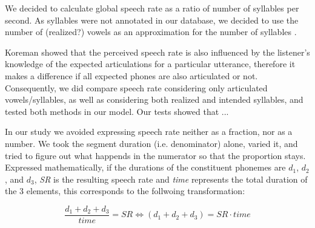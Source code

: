 \documentclass[a4paper]{scrreprt}
\begin{document}
We decided to calculate global speech rate as a ratio of number of syllables per second. As syllables were not annotated in our database, we decided to use the number of (realized?) vowels as an approximation for the number of syllables \cite{Yishan_Jiao_2015} \cite{Kohler1995}.

Koreman showed \cite{Koreman_2006} that the perceived speech rate is also influenced by the listener's knowledge of the expected articulations for a particular utterance, therefore it makes a difference if all expected phones are also articulated or not. Consequently, we did compare speech rate considering only articulated vowels/syllables, as well as considering both realized and intended syllables, and tested both methods in our model. Our tests showed that ...

In our study we avoided expressing speech rate neither as a fraction, nor as a number. We took the segment duration (i.e. denominator) alone, varied it, and tried to figure out what happends in the numerator so that the proportion stays. Expressed mathematically, if the durations of the constituent phonemes are $d_1$, $d_2$, and $d_3$, \textit{SR} is the resulting speech rate and \textit{time} represents the total duration of the 3 elements, this corresponds to the follwoing transformation:

$$\frac{d_1+d_2+d_3}{time} = SR \iff (d_1+d_2+d_3)  = SR \cdot time $$
\end{document}
